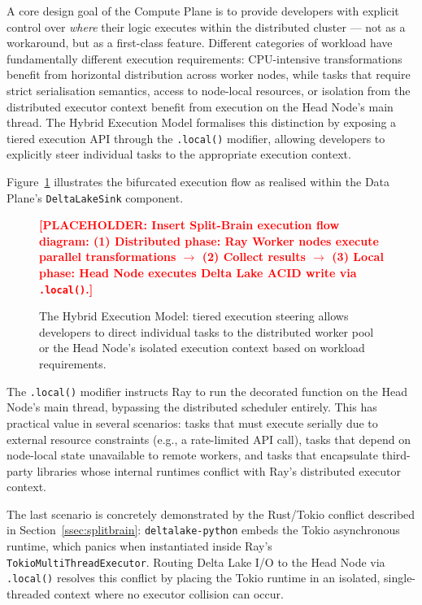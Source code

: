 \documentclass[12pt, a4paper]{report}
\newcommand{\placeholder}[1]{%
  \textcolor{red}{\textbf{[PLACEHOLDER: #1]}}%
}
\begin{document}
A core design goal of the Compute Plane is to provide developers with explicit control
over \emph{where} their logic executes within the distributed cluster — not as a
workaround, but as a first-class feature.
Different categories of workload have fundamentally different execution requirements:
CPU-intensive transformations benefit from horizontal distribution across worker nodes,
while tasks that require strict serialisation semantics, access to node-local resources,
or isolation from the distributed executor context benefit from execution on the Head
Node's main thread.
The Hybrid Execution Model formalises this distinction by exposing a tiered execution
API through the \texttt{.local()} modifier, allowing developers to explicitly steer
individual tasks to the appropriate execution context.

Figure~\ref{fig:split_brain} illustrates the bifurcated execution flow as realised
within the Data Plane's \texttt{DeltaLakeSink} component.

\begin{figure}[H]
  \centering
  \placeholder{Insert Split-Brain execution flow diagram:
  (1) Distributed phase: Ray Worker nodes execute parallel transformations $\rightarrow$
  (2) Collect results $\rightarrow$
  (3) Local phase: Head Node executes Delta Lake ACID write via \texttt{.local()}.}
  \caption{The Hybrid Execution Model: tiered execution steering allows developers to
  direct individual tasks to the distributed worker pool or the Head Node's isolated
  execution context based on workload requirements.}
  \label{fig:split_brain}
\end{figure}

The \texttt{.local()} modifier instructs Ray to run the decorated function on the Head
Node's main thread, bypassing the distributed scheduler entirely.
This has practical value in several scenarios:
tasks that must execute serially due to external resource constraints (e.g., a
rate-limited API call), tasks that depend on node-local state unavailable to remote
workers, and tasks that encapsulate third-party libraries whose internal runtimes
conflict with Ray's distributed executor context.

The last scenario is concretely demonstrated by the Rust/Tokio conflict described in
Section~\ref{ssec:splitbrain}: \texttt{deltalake-python} embeds the Tokio asynchronous
runtime, which panics when instantiated inside Ray's \texttt{TokioMultiThreadExecutor}.
Routing Delta Lake I/O to the Head Node via \texttt{.local()} resolves this conflict
by placing the Tokio runtime in an isolated, single-threaded context where no executor
collision can occur.
\end{document}

